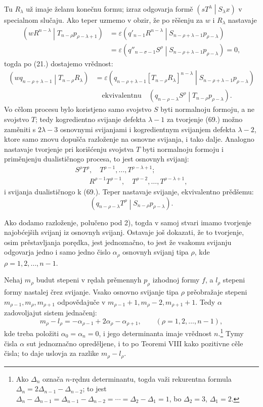 \documentclass[11pt]{article}
\newcommand{\pair}[2]{\left(#1\middle|#2\right)}
\newcommand{\eps}{\varepsilon}
\begin{document}
Tu $R_\lambda$ už imaje želanu konečnu formu; izraz odgovarja formě $\pair{sT^\lambda}{S_\lambda x}$ v specialnom slučaju. Ako teper uzmemo v obzir, že po rěšenju za $w$ i $R_\lambda$ nastavaje
\[
\begin{aligned}
 \pair{wR^{n-\lambda}}{T_{n-\rho}p_{\rho-\lambda+1}}
 &=\eps\pair{q'_{n-1}R^{n-\lambda}}{S_{n-\rho+\lambda-1}p_{\rho-\lambda}}\\
 &=\eps\pair{q''_{n-\sigma-1}S^\rho}{S_{n-\rho+\lambda-1}p_{\rho-\lambda}}=0,
\end{aligned}
\]
togda po (21.) dostajemo vrědnost:
\[
\begin{aligned}
 \pair{wq_{n-\rho+\lambda-1}}{T_{n-\rho}R_\lambda}
 &=\eps\pair{q_{n-\rho+\lambda-1}[T_{n-\rho}R_\lambda]^{n-\lambda}}{S_{n-\rho+\lambda-1}p_{\rho-\lambda}}\\
 &\quad\text{ekvivalentnu}\quad
 \pair{q_{n-\rho-\lambda}S^\rho}{T_{n-\rho}p_{\rho-\lambda}}.
\end{aligned}
\]
Vo cělom procesu bylo koristjeno samo svojstvo $S$ byti normalnoju formoju, a ne svojstvo $T$; tedy kogredientno svijanje defekta $\lambda-1$ za tvorjenje (69.) možno zaměniti s $2\lambda-3$ osnovnymi svijanjami i kogredientnym svijanjem defekta $\lambda-2$, ktore samo znovu dopušča razloženje na osnovne svijanja, i tako dalje. Analogno nastavaje tvorjenje pri korišćenju svojstva $T$ byti normalnoju formoju i priměnjenju dualističnogo procesa, to jest osnovnyh svijanj:
\[
\begin{aligned}
 S^\rho T^\rho,\quad T^{\rho-1},\ldots,T^{\rho-\lambda+1};\\
 \qquad R^{\rho-1}T^{\rho-1},\quad T^{\rho-2},\ldots,T^{\rho-\lambda+1},
\end{aligned}
\]
i svijanja dualističnogo k (69.). Teper nastavaje svijanje, ekvivalentno prědšemu:
\[
 \pair{q_{n-\rho-\lambda}T^\rho}{S_{n-\rho}p_{\rho-\lambda}}.
\]

Ako dodamo razloženje, polučeno pod 2), togda v samoj stvari imamo tvorjenje najobćejših svijanj iz osnovnyh svijanj. Ostavaje još dokazati, že to tvorjenje, osim prěstavljanja porędka, jest jednoznačno, to jest že vsakomu svijanju odgovarja jedno i samo jedno čislo $\alpha_\rho$ osnovnyh svijanj tipa $\rho$, kde $\rho=1,2,\ldots,n-1$.

Nehaj $m_\rho$ budut stepeni v rędah prěmennyh $p_\rho$ izhodnoj formy $f$, a $l_\rho$ stepeni formy nastalej črez svijanje. Vsako osnovno svijanje tipa $\rho$ prěobražaje stepeni $m_{\rho-1},m_\rho,m_{\rho+1}$ odpovědajuče v $m_{\rho-1}+1,m_\rho-2,m_{\rho+1}+1$. Tedy $\alpha$ zadovoljajut sistem jednačenj:
\begin{equation}
 m_\rho-l_\rho=-\alpha_{\rho-1}+2\alpha_\rho-\alpha_{\rho+1},
 \qquad (\rho=1,2,\ldots,n-1),
\tag{70}
\end{equation}
kde treba položiti $\alpha_0=\alpha_n=0$, i jego determinanta imaje vrědnost $n$.\footnote{Ako $\Delta_n$ označa $n$-rędnu determinantu, togda važi rekurentna formula $\Delta_n=2\Delta_{n-1}-\Delta_{n-2}$; to jest $\Delta_n-\Delta_{n-1}=\Delta_{n-1}-\Delta_{n-2}=\cdots=\Delta_2-\Delta_1=1$, bo $\Delta_2=3$, $\Delta_1=2$.} Tymy čisla $\alpha$ sut jednoznačno opreděljene, i to po Teoremi VIII kako pozitivne cěle čisla; to daje uslovja za razlike $m_\rho-l_\rho$.
\end{document}
